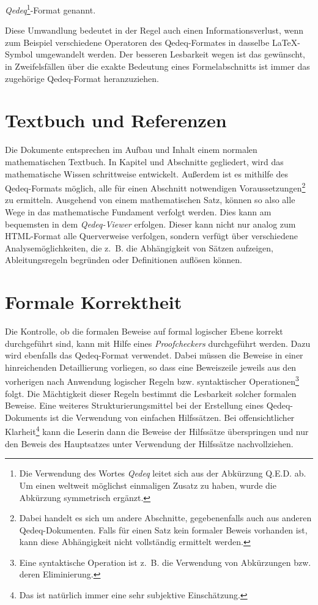 \documentclass[a4paper,german,10pt,twoside]{book}
\begin{document}
{\emph{Qedeq}\footnote{Die Verwendung des Wortes \emph{Qedeq} leitet sich aus der
Abk{\"u}rzung Q.E.D. ab. Um einen weltweit m{\"o}glichst einmaligen Zusatz zu haben, wurde die Abk{\"u}rzung
symmetrisch erg{\"a}nzt.}-Format genannt.
\par
Diese Umwandlung bedeutet in der Regel auch einen Informationsverlust, wenn zum Beispiel
verschiedene Operatoren des Qedeq-Formates in dasselbe \LaTeX{}-Symbol umgewandelt werden. Der
besseren Lesbarkeit wegen ist das gew{\"u}nscht, in Zweifelsf{\"a}llen {\"u}ber die exakte Bedeutung eines
Formelabschnitts ist immer das zugeh{\"o}rige Qedeq-Format heranzuziehen.

\section{Textbuch und Referenzen}
Die Dokumente entsprechen im Aufbau und Inhalt einem normalen mathematischen Textbuch. In Kapitel
und Abschnitte gegliedert, wird das mathematische Wissen schrittweise entwickelt. Au{\ss}erdem ist es
mithilfe des Qedeq-Formats m{\"o}glich, alle f{\"u}r einen Abschnitt notwendigen
Voraussetzungen\footnote{Dabei handelt es sich um andere Abschnitte, gegebenenfalls auch aus
anderen Qedeq-Dokumenten. Falls f{\"u}r einen Satz kein formaler Beweis vorhanden ist, kann diese
Abh{\"a}ngigkeit nicht vollst{\"a}ndig ermittelt werden.} zu ermitteln. Ausgehend von einem mathematischen
Satz, k{\"o}nnen so also alle Wege in das mathematische Fundament verfolgt werden. Dies kann am
bequemsten in dem \emph{Qedeq-Viewer} erfolgen. Dieser kann nicht nur analog
zum HTML-Format alle Querverweise verfolgen, sondern verf{\"u}gt {\"u}ber verschiedene
Analysem{\"o}glichkeiten, die z.~B. die Abh{\"a}ngigkeit von S{\"a}tzen aufzeigen, Ableitungsregeln begr{\"u}nden
oder Definitionen aufl{\"o}sen k{\"o}nnen.

\section{Formale Korrektheit}
Die Kontrolle, ob die formalen Beweise auf formal logischer Ebene korrekt durchgef{\"u}hrt sind, kann
mit Hilfe eines \emph{Proofcheckers} durchgef{\"u}hrt werden. Dazu wird ebenfalls
das Qedeq-Format verwendet. Dabei m{\"u}ssen die Beweise in einer hinreichenden Detaillierung
vorliegen, so dass eine Beweiszeile jeweils aus den vorherigen nach Anwendung logischer Regeln bzw.
syntaktischer Operationen\footnote{Eine syntaktische Operation ist z.~B. die Verwendung von
Abk{\"u}rzungen bzw. deren Eliminierung.} folgt. Die M{\"a}chtigkeit dieser Regeln bestimmt die Lesbarkeit
solcher formalen Beweise. Eine weiteres Strukturierungsmittel bei der Erstellung eines
Qedeq-Dokuments ist die Verwendung von einfachen Hilfss{\"a}tzen. Bei offensichtlicher
Klarheit\footnote{Das ist nat{\"u}rlich immer eine sehr subjektive Einsch{\"a}tzung.} kann die Leserin dann
die Beweise der Hilfss{\"a}tze {\"u}berspringen und nur den Beweis des Hauptsatzes unter Verwendung der
Hilfss{\"a}tze nachvollziehen.

}
\end{document}
